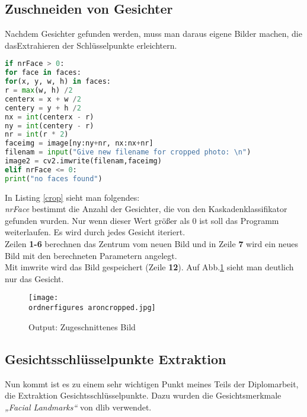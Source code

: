 	
\subsection{Zuschneiden von Gesichter}

Nachdem Gesichter gefunden werden, muss man daraus eigene Bilder machen, die dasExtrahieren der Schlüsselpunkte erleichtern.\\  

\begin{lstlisting}[language=python,caption=Code Abschnitt: Gesicht
Zuschneiden,label=crop]
if nrFace > 0:
for face in faces:
for(x, y, w, h) in faces:
r = max(w, h) /2 
centerx = x + w /2 
centery = y + h /2
nx = int(centerx - r) 
ny = int(centery - r) 
nr = int(r * 2) 
faceimg = image[ny:ny+nr, nx:nx+nr] 
filenam = input("Give new filename for cropped photo: \n")
image2 = cv2.imwrite(filenam,faceimg)
elif nrFace <= 0:
print("no faces found")

\end{lstlisting}

In Listing \ref{crop} sieht man folgendes:\\

\textit{nrFace} bestimmt die Anzahl der Gesichter, die von den
Kaskadenklassifikator gefunden wurden. 
Nur wenn dieser Wert größer als 0 ist soll das Programm weiterlaufen.  
Es wird durch jedes Gesicht iteriert.
\\

Zeilen \textbf{1-6} berechnen das Zentrum vom neuen Bild und in Zeile \textbf{7}
wird ein neues Bild mit den berechneten Parametern angelegt.\\
Mit imwrite wird das Bild gespeichert (Zeile \textbf{12}). 
Auf Abb.\ref{fig:aroncropped} sieht man deutlich nur das Gesicht.
\\

\begin{figure}[H]
	\centering
	\texttt{[image: \\ordnerfigures aroncropped.jpg]}
	\caption{Output: Zugeschnittenes Bild}
	\label{fig:aroncropped}
\end{figure}

	
\subsection{Gesichtsschlüsselpunkte Extraktion}
\label{gspex}

Nun kommt ist es zu einem sehr wichtigen Punkt meines Teils der Diplomarbeit, die Extraktion Gesichtsschlüsselpunkte. 
Dazu wurden die Gesichtsmerkmale \textit{„Facial Landmarks“} von dlib verwendet.

